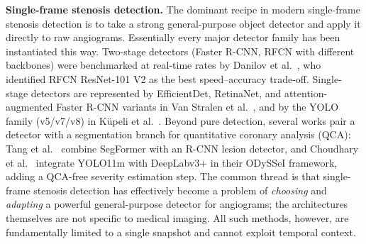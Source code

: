 \documentclass[conference]{IEEEtran}
\begin{document}
\textbf{Single-frame stenosis detection.} The dominant recipe in modern single-frame stenosis detection is to take a strong general-purpose object detector and apply it directly to raw angiograms. Essentially every major detector family has been instantiated this way. Two-stage detectors (Faster R-CNN, RFCN with different backbones) were benchmarked at real-time rates by Danilov et al.~\cite{Danilov2021}, who identified RFCN ResNet-101 V2 as the best speed--accuracy trade-off. Single-stage detectors are represented by EfficientDet, RetinaNet, and attention-augmented Faster R-CNN variants in Van Stralen et al.~\cite{attentionstenosis}, and by the YOLO family (v5/v7/v8) in K\"upeli et al.~\cite{kupeli2025yolo}. Beyond pure detection, several works pair a detector with a segmentation branch for quantitative coronary analysis (QCA): Tang et al.~\cite{aipoweredrealtime} combine SegFormer with an R-CNN lesion detector, and Choudhary et al.~\cite{choudhary2026odysseiopensourceendtoendframework} integrate YOLO11m with DeepLabv3+ in their ODySSeI framework, adding a QCA-free severity estimation step. The common thread is that single-frame stenosis detection has effectively become a problem of \emph{choosing} and \emph{adapting} a powerful general-purpose detector for angiograms; the architectures themselves are not specific to medical imaging. All such methods, however, are fundamentally limited to a single snapshot and cannot exploit temporal context.
\end{document}
